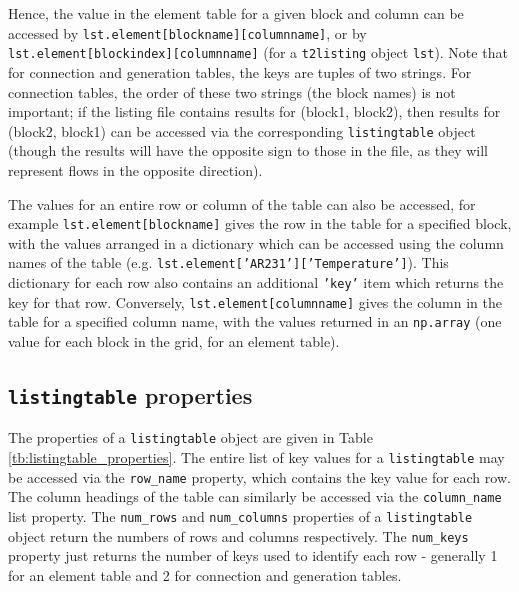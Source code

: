 Hence, the value in the element table for a given block and column can be accessed by \texttt{lst.element[blockname][columnname]}, or by \texttt{lst.element[blockindex][columnname]} (for a \texttt{t2listing} object \texttt{lst}).  Note that for connection and generation tables, the keys are tuples of two strings.  For connection tables, the order of these two strings (the block names) is not important; if the listing file contains results for (block1, block2), then results for (block2, block1) can be accessed via the corresponding \texttt{listingtable} object (though the results will have the opposite sign to those in the file, as they will represent flows in the opposite direction).

The values for an entire row or column of the table can also be accessed, for example \texttt{lst.element[blockname]} gives the row in the table for a specified block, with the values arranged in a dictionary which can be accessed using the column names of the table (e.g. \texttt{lst.element['AR231']['Temperature']}).  This dictionary for each row also contains an additional \texttt{'key'} item which returns the key for that row.  Conversely, \texttt{lst.element[columnname]} gives the column in the table for a specified column name, with the values returned in an \texttt{np.array} (one value for each block in the grid, for an element table).

\subsection{\texttt{listingtable} properties}

The properties of a \texttt{listingtable} object are given in Table \ref{tb:listingtable_properties}.  The entire list of key values for a \texttt{listingtable} may be accessed via the \texttt{row\_name} property, which contains the key value for each row.  The column headings of the table can similarly be accessed via the \texttt{column\_name} list property.  The \texttt{num\_rows} and \texttt{num\_columns} properties of a \texttt{listingtable} object return the numbers of rows and columns respectively.  The \texttt{num\_keys} property just returns the number of keys used to identify each row - generally 1 for an element table and 2 for connection and generation tables.

